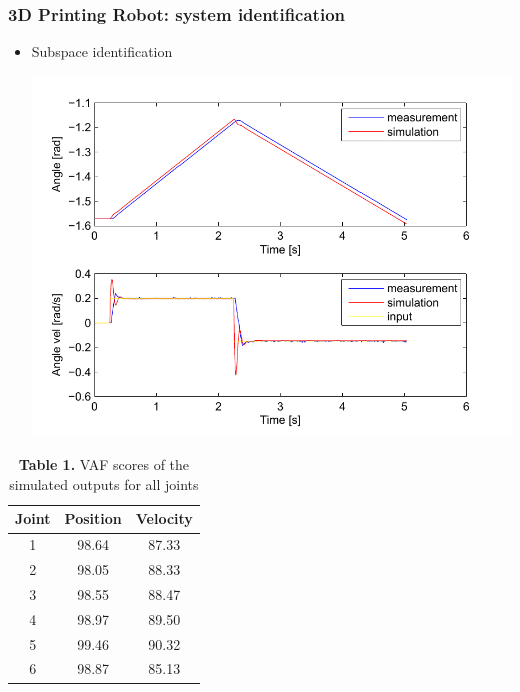 \documentclass{beamer}
\begin{document}
	\begin{frame}\frametitle{3D Printing Robot: system identification}
		\begin{itemize}
			\item Subspace identification
				\begin{center}
					\includegraphics[width=0.53\linewidth]{images/Joint1}
				\end{center}

	\end{itemize}
			\begin{table}
				\fontsize{7}{4}\selectfont 
				\caption{\fontsize{8}{4}\selectfont  \textbf{Table 1.} VAF scores of the simulated outputs for all joints}	
				\centering
				\begin{tabular}{|c|c|c|}
					\hline Joint & Position  & Velocity \\ 
					\hline 1 & 98.64 & 87.33 \\ 
					\hline 2 & 98.05 & 88.33 \\ 
					\hline 3 & 98.55 & 88.47 \\ 
					\hline 4 & 98.97 & 89.50 \\ 
					\hline 5 & 99.46 & 90.32 \\ 
					\hline 6 & 98.87 & 85.13 \\ 
					\hline 
				\end{tabular} 
				\label{tab:vaf}
			\end{table}
							
	\end{frame}
			
\end{document}
